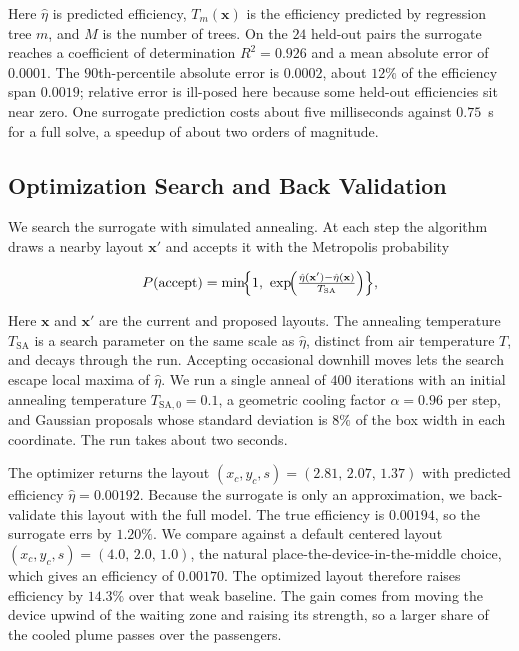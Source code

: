 \documentclass[11pt]{article}
\begin{document}
Here $\hat\eta$ is predicted efficiency, $T_m(\mathbf{x})$ is the efficiency
predicted by regression tree $m$, and $M$ is the number of trees. On the $24$
held-out pairs the surrogate reaches a coefficient of determination $R^2=0.926$
and a mean absolute error of
$0.0001$. The $90$th-percentile absolute error is $0.0002$, about $12\%$ of the
efficiency span $0.0019$; relative error is ill-posed here because some
held-out efficiencies sit near zero. One surrogate prediction costs about five
milliseconds against $0.75$~s for a full solve, a speedup of about two orders
of magnitude.

\subsection{Optimization Search and Back Validation}

We search the surrogate with simulated annealing. At each step the algorithm
draws a nearby layout $\mathbf{x}'$ and accepts it with the Metropolis
probability

\begin{equation}
P(\text{accept}) =
\min\!\Bigl\{1,\ \exp\!\Bigl(\tfrac{\hat\eta(\mathbf{x}')-\hat\eta(\mathbf{x})}{T_{\mathrm{SA}}}\Bigr)\Bigr\},
\label{eq:sa}
\end{equation}

Here $\mathbf{x}$ and $\mathbf{x}'$ are the current and proposed layouts.
The annealing temperature $T_{\mathrm{SA}}$ is a search parameter on the same
scale as $\hat\eta$, distinct from air temperature $T$, and decays through the run.
Accepting occasional downhill moves lets the search escape local maxima of
$\hat\eta$. We run a single anneal of $400$ iterations with an initial annealing
temperature $T_{\mathrm{SA},0}=0.1$, a geometric cooling factor $\alpha=0.96$ per step, and Gaussian proposals whose
standard deviation is $8\%$ of the box width in each coordinate. The run takes
about two seconds.

The optimizer returns the layout $(x_c,y_c,s)=(2.81,\,2.07,\,1.37)$ with
predicted efficiency $\hat\eta=0.00192$. Because the surrogate is only an
approximation, we back-validate this layout with the full model. The true
efficiency is $0.00194$, so the surrogate errs by $1.20\%$. We compare against
a default centered layout $(x_c,y_c,s)=(4.0,\,2.0,\,1.0)$, the natural
place-the-device-in-the-middle choice, which gives an efficiency of $0.00170$.
The optimized layout therefore raises efficiency by $14.3\%$ over that weak
baseline. The gain comes from moving the device upwind of the waiting zone and
raising its strength, so a larger share of the cooled plume passes over the
passengers.
\end{document}
